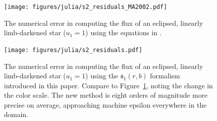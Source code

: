 \documentclass[modern]{aastex61}
\begin{document}
\begin{figure}[p!]
    \begin{centering}
    \texttt{[image: figures/julia/s2\_residuals\_MA2002.pdf]}
    \caption{The numerical error in computing the flux of an eclipsed, linearly
             limb-darkened star ($u_1=1$) using the equations in \citet{MandelAgol2002}.
             \label{fig:s2_plot_MA2002}}
    \end{centering}
\end{figure}

\begin{figure}[p!]
    \begin{centering}
    \texttt{[image: figures/julia/s2\_residuals.pdf]}
    \caption{The numerical error in computing the flux of an eclipsed, linearly
    limb-darkened star ($u_1=1$) using the $\mathfrak{s}_1(r,b)$ formalism introduced in this
    paper. Compare to Figure~\ref{fig:s2_plot_MA2002}, noting the change in the color
    scale. The new method is eight orders of magnitude more precise on average,
    approaching machine epsilon everywhere in the domain.
    \label{fig:s2_plot}}
    \end{centering}
\end{figure}


\pagebreak %
\end{document}
